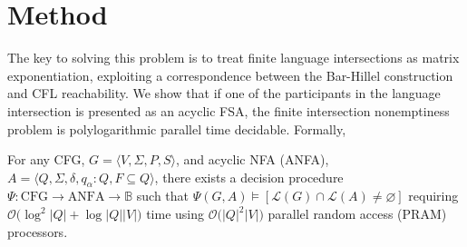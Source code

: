 \documentclass[sigplan,review,acmsmall,nonacm,screen,anonymous]{acmart}\settopmatter{printfolios=false,printccs=false,printacmref=false}
\begin{document}
\clearpage\section{Method}\label{sec:method}

The key to solving this problem is to treat finite language intersections as matrix exponentiation, exploiting a correspondence between the Bar-Hillel construction and CFL reachability. We show that if one of the participants in the language intersection is presented as an acyclic FSA, the finite intersection nonemptiness problem is polylogarithmic parallel time decidable. Formally,

\begin{theorem}\label{thm:parallel_decision_complexity}
  For any CFG, $G = \langle V, \Sigma, P, S\rangle$, and acyclic NFA (ANFA), $A = \langle Q, \Sigma, \delta, q_\alpha: Q, F \subseteq Q\rangle$, there exists a decision procedure $\Psi: \text{CFG} \rightarrow \text{ANFA} \rightarrow \mathbb{B}$ such that $\Psi(G, A) \models [\mathcal{L}(G)\cap\mathcal{L}(A) \neq \varnothing]$ requiring $\mathcal{O}\big(\log^2|Q|+\log|Q||V|\big)$ time using $\mathcal{O}\big(|Q|^2|V|\big)$ parallel random access (PRAM) processors.
\end{theorem}
\end{document}
